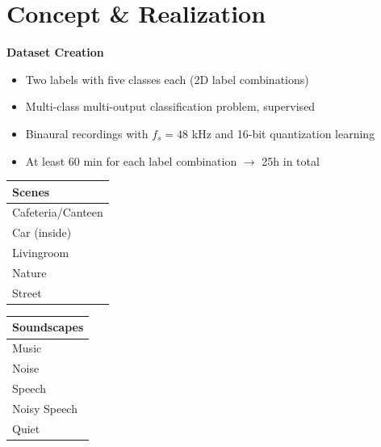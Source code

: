 \documentclass[xcolor=dvipsnames,aspectratio=169,beamer]{beamer}
\begin{document}
\section{Concept \& Realization}

\begin{frame}
	\textbf{Dataset Creation}
	\begin{itemize}
	\item<1-> Two labels with five classes each (\glqq{}2D\grqq{} label combinations)
	\item<2-> Multi-class multi-output classification problem, supervised
	\item<3-> Binaural recordings with $f_s=48$ kHz and 16-bit quantization learning
	\item<4-> At least 60 min for each label combination $\rightarrow$ 25h in total
	\end{itemize}
	
	\begin{flushleft}
	\begin{minipage}{0.6\textwidth}
	
	\vspace{5mm}
	\begin{minipage}{0.47\textwidth}
	\begin{table}[h!]
		\small
    	\raggedleft
		\begin{tabular}{C{3cm}} 
    	\toprule
		Scenes \\
		\midrule
		Cafeteria/Canteen \\
		Car (inside) \\
		Livingroom \\
		Nature \\
		Street \\
		\bottomrule
		\end{tabular}
	\end{table}
	\end{minipage}
	\hspace{2mm}
	\begin{minipage}{0.47\textwidth}
	\begin{table}[h!]
		\small
    	\raggedright
		\begin{tabular}{C{3cm}} 
    	\toprule
		Soundscapes \\
		\midrule
		Music \\
		Noise \\
		Speech \\
		Noisy Speech \\
		Quiet \\		
		\bottomrule
		\end{tabular}
	\end{table}
	\end{minipage}
	

\end{minipage}
\end{flushleft}
\end{frame}
\end{document}
